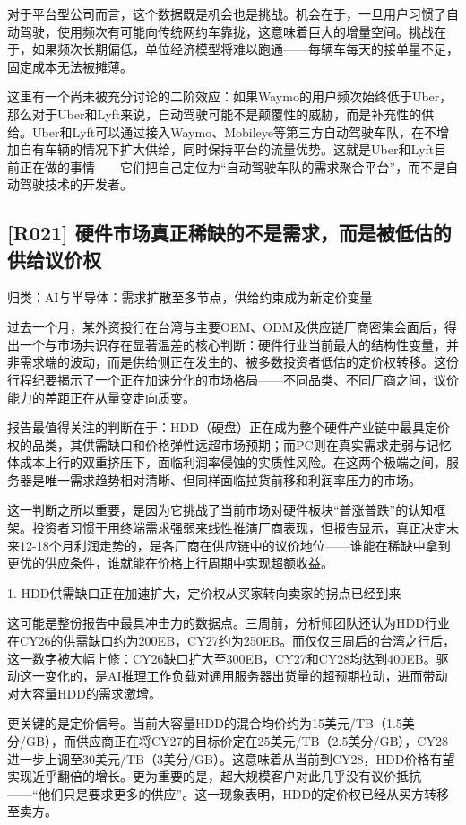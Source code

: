 \documentclass[11pt]{ctexart}
\begin{document}
对于平台型公司而言，这个数据既是机会也是挑战。机会在于，一旦用户习惯了自动驾驶，使用频次有可能向传统网约车靠拢，这意味着巨大的增量空间。挑战在于，如果频次长期偏低，单位经济模型将难以跑通——每辆车每天的接单量不足，固定成本无法被摊薄。

这里有一个尚未被充分讨论的二阶效应：如果Waymo的用户频次始终低于Uber，那么对于Uber和Lyft来说，自动驾驶可能不是颠覆性的威胁，而是补充性的供给。Uber和Lyft可以通过接入Waymo、Mobileye等第三方自动驾驶车队，在不增加自有车辆的情况下扩大供给，同时保持平台的流量优势。这就是Uber和Lyft目前正在做的事情——它们把自己定位为“自动驾驶车队的需求聚合平台”，而不是自动驾驶技术的开发者。

\subsection{[R021] 硬件市场真正稀缺的不是需求，而是被低估的供给议价权}
{\small\color{refgray}归类：AI与半导体：需求扩散至多节点，供给约束成为新定价变量}

过去一个月，某外资投行在台湾与主要OEM、ODM及供应链厂商密集会面后，得出一个与市场共识存在显著温差的核心判断：硬件行业当前最大的结构性变量，并非需求端的波动，而是供给侧正在发生的、被多数投资者低估的定价权转移。这份行程纪要揭示了一个正在加速分化的市场格局——不同品类、不同厂商之间，议价能力的差距正在从量变走向质变。

报告最值得关注的判断在于：HDD（硬盘）正在成为整个硬件产业链中最具定价权的品类，其供需缺口和价格弹性远超市场预期；而PC则在真实需求走弱与记忆体成本上行的双重挤压下，面临利润率侵蚀的实质性风险。在这两个极端之间，服务器是唯一需求趋势相对清晰、但同样面临拉货前移和利润率压力的市场。

这一判断之所以重要，是因为它挑战了当前市场对硬件板块“普涨普跌”的认知框架。投资者习惯于用终端需求强弱来线性推演厂商表现，但报告显示，真正决定未来12-18个月利润走势的，是各厂商在供应链中的议价地位——谁能在稀缺中拿到更优的供应条件，谁就能在价格上行周期中实现超额收益。

1. HDD供需缺口正在加速扩大，定价权从买家转向卖家的拐点已经到来

这可能是整份报告中最具冲击力的数据点。三周前，分析师团队还认为HDD行业在CY26的供需缺口约为200EB，CY27约为250EB。而仅仅三周后的台湾之行后，这一数字被大幅上修：CY26缺口扩大至300EB，CY27和CY28均达到400EB。驱动这一变化的，是AI推理工作负载对通用服务器出货量的超预期拉动，进而带动对大容量HDD的需求激增。

更关键的是定价信号。当前大容量HDD的混合均价约为15美元/TB（1.5美分/GB），而供应商正在将CY27的目标价定在25美元/TB（2.5美分/GB），CY28进一步上调至30美元/TB（3美分/GB）。这意味着从当前到CY28，HDD价格有望实现近乎翻倍的增长。更为重要的是，超大规模客户对此几乎没有议价抵抗——“他们只是要求更多的供应”。这一现象表明，HDD的定价权已经从买方转移至卖方。
\end{document}
